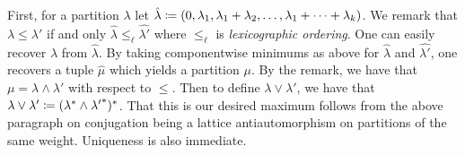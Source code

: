 \documentclass[letterpaper, 11pt, oneside]{book}
\begin{document}
\begin{sol}
  First, for a partition $\lambda$ let $\hat{\lambda} \coloneqq (0, \lambda_{1}, \lambda_{1} + \lambda_{2}, \ldots, \lambda_{1} + \cdots + \lambda_{k})$.
  We remark that $\lambda \leq \lambda'$ if and only $\hat{\lambda} \leq_{\ell} \hat{\lambda'}$ where $\leq_{\ell}$ is \emph{lexicographic ordering}.
  One can easily recover $\lambda$ from $\hat{\lambda}$.
  By taking componentwise minimums as above for $\hat{\lambda}$ and $\hat{\lambda'}$, one recovers a tuple $\hat{\mu}$ which yields a partition $\mu$.
  By the remark, we have that $\mu = \lambda \land \lambda'$ with respect to $\leq$.
  Then to define $\lambda \lor \lambda'$, we have that $\lambda \lor \lambda' \coloneqq (\lambda^{*} \land {\lambda'}^{*})^{*}$.
  That this is our desired maximum follows from the above paragraph on conjugation being a lattice antiautomorphism on partitions of the same weight.
  Uniqueness is also immediate.
\end{sol}

\printbibliography
\end{document}
